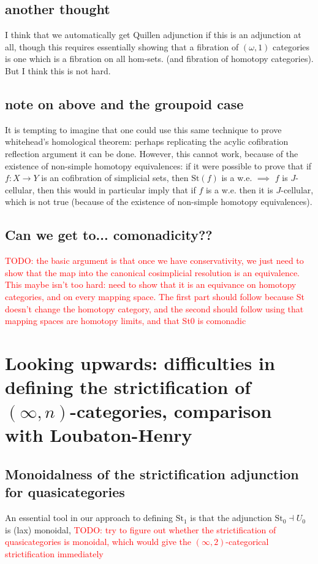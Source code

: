 \documentclass[12pt]{article}
\theoremstyle{definition}
\newcommand{\TODO}[1]{\textcolor{red}{TODO: {#1}}}
\newcommand{\st}{\text{St}}
\begin{document}
\subsection{another thought}
I think that we automatically get Quillen adjunction if this is an adjunction at all, though this requires essentially showing that a fibration of $(\omega,1)$ categories is one which is a fibration on all hom-sets. (and fibration of homotopy categories). But I think this is not hard.

\subsection{note on above and the groupoid case}
	It is tempting to imagine that one could use this same technique to prove whitehead's homological theorem: perhaps replicating the acylic cofibration reflection argument it can be done. However, this cannot work, because of the existence of non-simple homotopy equivalences: if it were possible to prove that if $f: X \to Y$ is an cofibration of simplicial sets, then $\st(f)$ is a w.e. $\implies$ $f$ is $J$-cellular, then this would in particular imply that if $f$ is a w.e. then it is $J$-cellular, which is not true (because of the existence of non-simple homotopy equivalences).
	
\subsection{Can we get to... comonadicity??}
	\TODO{the basic argument is that once we have conservativity, we just need to show that the map into the canonical cosimplicial resolution is an equivalence. This maybe isn't too hard: need to show that it is an equivance on homotopy categories, and on every mapping space. The first part should follow because St doesn't change the homotopy category, and the second should follow using that mapping spaces are homotopy limits, and that St0 is comonadic}

\section{Looking upwards: difficulties in defining the strictification of $(\infty,n)$-categories, comparison with Loubaton-Henry}
	\subsection{Monoidalness of the strictification adjunction for quasicategories}
		An essential tool in our approach to defining $\text{St}_1$ is that the adjunction $\text{St}_0 \dashv U_0$ is (lax) monoidal, 
		\TODO{try to figure out whether the strictification of quasicategories is monoidal, which would give the $(\infty,2)$-categorical strictification immediately}
\end{document}
